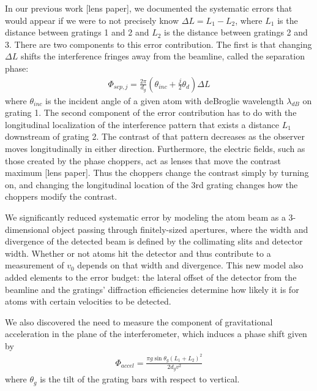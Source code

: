 \documentclass[twocolumn, prl,showpacs,superscriptaddress]{revtex4-1}   %
\begin{document}
In our previous work [lens paper], we documented the systematic errors that would appear if we were to not precisely know $\Delta L = L_1 - L_2$, where $L_1$ is the distance between gratings 1 and 2 and $L_2$ is the distance between gratings 2 and 3. There are two components to this error contribution. The first is that changing $\Delta L$ shifts the interference fringes away from the beamline, called the separation phase:
\begin{align}
	\Phi_{sep,j} = \frac{2\pi}{d_g}
	\left(
		\theta_{inc} + \frac{j}{2}\theta_d
	\right) \Delta L
	\label{phiSep}
\end{align}
where $\theta_{inc}$ is the incident angle of a given atom with deBroglie wavelength $\lambda_{dB}$ on grating 1. The second component of the error contribution has to do with the longitudinal localization of the interference pattern that exists a distance $L_1$ downstream of grating 2. The contrast of that pattern decreases as the observer moves longitudinally in either direction. Furthermore, the electric fields, such as those created by the phase choppers, 
act as lenses that move the contrast maximum [lens paper]. Thus the choppers change the contrast simply by turning on, and changing the longitudinal location of the 3rd grating changes how the choppers modify the contrast. 

We significantly reduced systematic error by modeling the atom beam as a 3-dimensional object passing through finitely-sized apertures, where the width and divergence of the detected beam is defined by the collimating slits and detector width. Whether or not atoms hit the detector and thus contribute to a measurement of $v_0$ depends on that width and divergence. This new model also added elements to the error budget: the lateral offset of the detector from the beamline and the gratings' diffraction efficiencies determine how likely it is for atoms with certain velocities to be detected.

We also discovered the need to measure the component of gravitational acceleration in the plane of the interferometer, which induces a phase shift given by
\begin{align}
	\Phi_{accel} = \frac{\pi g\sin{\theta_g}(L_1+L_2)^2}{2d_g v^2}
	\label{phiAccel}
\end{align}
where $\theta_g$ is the tilt of the grating bars with respect to vertical.
\end{document}
